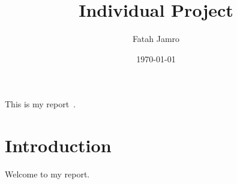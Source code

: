 \documentclass[a4paper, 12pt]{scrartcl}
\title{Individual Project}
\author{Fatah Jamro}
\date{\today}
\begin{document}
  
  \maketitle
  
  \noindent This is my report~\cite{md5}.

 

  \section{Introduction}

  Welcome to my report.

  
  
  
\end{document}
